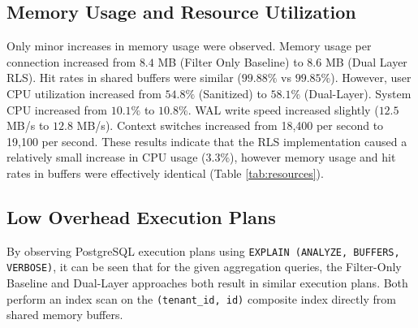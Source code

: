 \documentclass[conference]{IEEEtran}
\begin{document}
\subsection{Memory Usage and Resource Utilization}
Only minor increases in memory usage were observed. Memory usage per connection increased from $8.4$ MB (Filter Only Baseline) to $8.6$ MB (Dual Layer RLS). Hit rates in shared buffers were similar ($99.88\%$ vs $99.85\%$). However, user CPU utilization increased from $54.8\%$ (Sanitized) to $58.1\%$ (Dual-Layer). System CPU increased from $10.1\%$ to $10.8\%$. WAL write speed increased slightly ($12.5$ MB/s to $12.8$ MB/s). Context switches increased from 18,400 per second to 19,100 per second. These results indicate that the RLS implementation caused a relatively small increase in CPU usage ($3.3\%$), however memory usage and hit rates in buffers were effectively identical (Table \ref{tab:resources}).

\begin{table}[t]
\renewcommand{\arraystretch}{0.95}
\caption{PostgreSQL System Resource Consumption Profile}
\label{tab:resources}
\centering
\scriptsize
\setlength{\tabcolsep}{3pt}
\end{table}

\subsection{Low Overhead Execution Plans}
By observing PostgreSQL execution plans using \texttt{EXPLAIN (ANALYZE, BUFFERS, VERBOSE)}, it can be seen that for the given aggregation queries, the Filter-Only Baseline and Dual-Layer approaches both result in similar execution plans. Both perform an index scan on the \texttt{(tenant\_id, id)} composite index directly from shared memory buffers.
\end{document}

